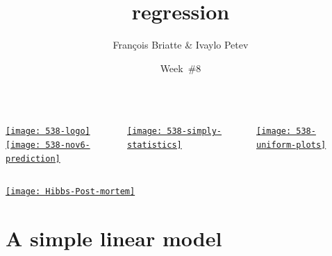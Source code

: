 \documentclass[t]{beamer}
\title{regression}
\author{François Briatte \& Ivaylo Petev}
\date{Week~\#8}
\begin{document}
	
    \frame[plain]{
		\titlepage\\[7em]
		\tableofcontents[hideallsubsections]
		}



	\begin{frame}[c]%
				 
		\begin{columns}[T]

			\href{http://fivethirtyeight.blogs.nytimes.com/}{%
				\texttt{[image: 538-logo]}\\%
				\texttt{[image: 538-nov6-prediction]}%
			}
		

			\href{http://simplystatistics.org/post/35187901781/nate-silver-does-it-again-will-pundits-finally-accept}{\texttt{[image: 538-simply-statistics]}}
			
			\href{http://www.acthomas.ca/comment/2012/11/538s-uncertainty-estimates-are-as-good-as-they-get.html}{\texttt{[image: 538-uniform-plots]}}
		
		\end{columns}
		
	\end{frame}
	
	\begin{frame}[c]%
			
		\begin{center}
			\href{http://www.douglas-hibbs.com/HibbsArticles/Web-2012-Post-mortem.htm}{\texttt{[image: Hibbs-Post-mortem]}}
		\end{center}
				
	\end{frame}

	
	\section{A simple linear model} %
	
\end{document}
